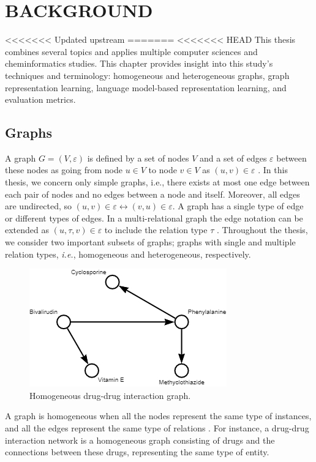\chapter{BACKGROUND}
\label{background}

<<<<<<< Updated upstream
=======
<<<<<<< HEAD
This thesis combines several topics and applies multiple computer sciences and cheminformatics studies. This chapter provides insight into this study's techniques and terminology: homogeneous and heterogeneous graphs, graph representation learning, language model-based representation learning, and evaluation metrics. 

\section{Graphs}
A graph $G = (V, \varepsilon)$ is defined by a set of nodes $V$ and a set of edges $\varepsilon$ between these nodes as going from node $u \in V$ to node $v \in V$ as $(u,v) \in \varepsilon$ \cite{biggs1993algebraic}. In this thesis, we concern only simple graphs, i.e., there exists at most one edge between each pair of nodes and no edges between a node and itself. Moreover, all edges are undirected, so $(u,v) \in \varepsilon \longleftrightarrow (v,u) \in \varepsilon$. A graph has a single type of edge or different types of edges. In a multi-relational graph the edge notation can be extended as $(u,\tau,v) \in \varepsilon$ to include the relation type $\tau$ \cite{hamilton2020graph}. Throughout the thesis, we consider two important subsets of graphs; graphs with single and multiple relation types, \textit{i.e.}, homogeneous and heterogeneous, respectively. 

\begin{figure}[h]
    \centering
        \includegraphics[width=0.5\linewidth]{chapters/background/figures/ddi.png} 
    \caption{Homogeneous drug-drug interaction graph.}
    \label{fig:sample_ddi}
\end{figure}
A graph is homogeneous when all the nodes represent the same type of instances, and all the edges represent the same type of relations \cite{gardiner1976homogeneoys, gardiner1978homogeneity}. For instance, a drug-drug interaction network is a homogeneous graph consisting of drugs and the connections between these drugs, representing the same type of entity. 


